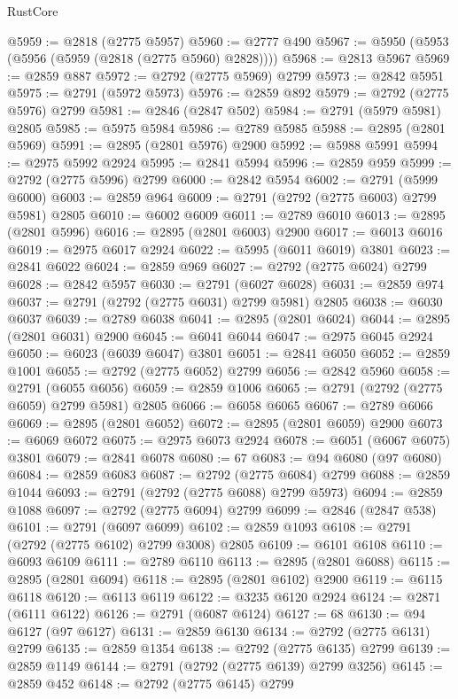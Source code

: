 \begin{lexlean}{RustCore}
\begin{coremodule}
@5959 := @2818 (@2775 @5957)
@5960 := @2777 @490
@5967 := @5950 (@5953 (@5956 (@5959 (@2818 (@2775 @5960) @2828))))
@5968 := @2813 @5967
@5969 := @2859 @887
@5972 := @2792 (@2775 @5969) @2799
@5973 := @2842 @5951
@5975 := @2791 (@5972 @5973)
@5976 := @2859 @892
@5979 := @2792 (@2775 @5976) @2799
@5981 := @2846 (@2847 @502)
@5984 := @2791 (@5979 @5981) @2805
@5985 := @5975 @5984
@5986 := @2789 @5985
@5988 := @2895 (@2801 @5969)
@5991 := @2895 (@2801 @5976) @2900
@5992 := @5988 @5991
@5994 := @2975 @5992 @2924
@5995 := @2841 @5994
@5996 := @2859 @959
@5999 := @2792 (@2775 @5996) @2799
@6000 := @2842 @5954
@6002 := @2791 (@5999 @6000)
@6003 := @2859 @964
@6009 := @2791 (@2792 (@2775 @6003) @2799 @5981) @2805
@6010 := @6002 @6009
@6011 := @2789 @6010
@6013 := @2895 (@2801 @5996)
@6016 := @2895 (@2801 @6003) @2900
@6017 := @6013 @6016
@6019 := @2975 @6017 @2924
@6022 := @5995 (@6011 @6019) @3801
@6023 := @2841 @6022
@6024 := @2859 @969
@6027 := @2792 (@2775 @6024) @2799
@6028 := @2842 @5957
@6030 := @2791 (@6027 @6028)
@6031 := @2859 @974
@6037 := @2791 (@2792 (@2775 @6031) @2799 @5981) @2805
@6038 := @6030 @6037
@6039 := @2789 @6038
@6041 := @2895 (@2801 @6024)
@6044 := @2895 (@2801 @6031) @2900
@6045 := @6041 @6044
@6047 := @2975 @6045 @2924
@6050 := @6023 (@6039 @6047) @3801
@6051 := @2841 @6050
@6052 := @2859 @1001
@6055 := @2792 (@2775 @6052) @2799
@6056 := @2842 @5960
@6058 := @2791 (@6055 @6056)
@6059 := @2859 @1006
@6065 := @2791 (@2792 (@2775 @6059) @2799 @5981) @2805
@6066 := @6058 @6065
@6067 := @2789 @6066
@6069 := @2895 (@2801 @6052)
@6072 := @2895 (@2801 @6059) @2900
@6073 := @6069 @6072
@6075 := @2975 @6073 @2924
@6078 := @6051 (@6067 @6075) @3801
@6079 := @2841 @6078
@6080 := 67
@6083 := @94 @6080 (@97 @6080)
@6084 := @2859 @6083
@6087 := @2792 (@2775 @6084) @2799
@6088 := @2859 @1044
@6093 := @2791 (@2792 (@2775 @6088) @2799 @5973)
@6094 := @2859 @1088
@6097 := @2792 (@2775 @6094) @2799
@6099 := @2846 (@2847 @538)
@6101 := @2791 (@6097 @6099)
@6102 := @2859 @1093
@6108 := @2791 (@2792 (@2775 @6102) @2799 @3008) @2805
@6109 := @6101 @6108
@6110 := @6093 @6109
@6111 := @2789 @6110
@6113 := @2895 (@2801 @6088)
@6115 := @2895 (@2801 @6094)
@6118 := @2895 (@2801 @6102) @2900
@6119 := @6115 @6118
@6120 := @6113 @6119
@6122 := @3235 @6120 @2924
@6124 := @2871 (@6111 @6122)
@6126 := @2791 (@6087 @6124)
@6127 := 68
@6130 := @94 @6127 (@97 @6127)
@6131 := @2859 @6130
@6134 := @2792 (@2775 @6131) @2799
@6135 := @2859 @1354
@6138 := @2792 (@2775 @6135) @2799
@6139 := @2859 @1149
@6144 := @2791 (@2792 (@2775 @6139) @2799 @3256)
@6145 := @2859 @452
@6148 := @2792 (@2775 @6145) @2799

\end{coremodule}
\end{lexlean}

